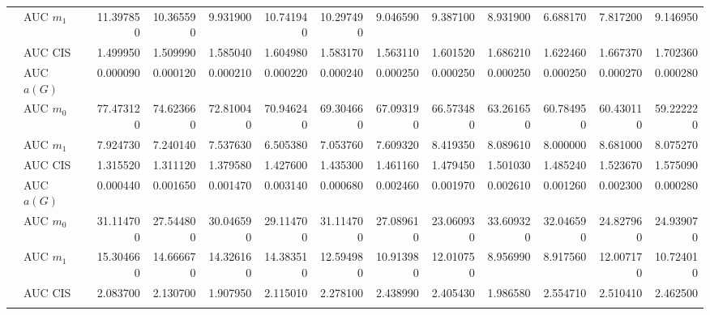 \begin{table}[htbp]
\begin{tabular}{llrrrrrrrrrrr}
    & AUC $m_1$ & 11.397850 & 10.365590 & 9.931900 & 10.741940 & 10.297490 & 9.046590 & 9.387100 & 8.931900 & 6.688170 & 7.817200 & 9.146950 \\
    & AUC CIS & 1.499950 & 1.509990 & 1.585040 & 1.604980 & 1.583170 & 1.563110 & 1.601520 & 1.686210 & 1.622460 & 1.667370 & 1.702360 \\
    \addlinespace
    \multirow{4}{*}{degree} & AUC $a(G)$ & 0.000090 & 0.000120 & 0.000210 & 0.000220 & 0.000240 & 0.000250 & 0.000250 & 0.000250 & 0.000250 & 0.000270 & 0.000280 \\
    & AUC $m_0$ & 77.473120 & 74.623660 & 72.810040 & 70.946240 & 69.304660 & 67.093190 & 66.573480 & 63.261650 & 60.784950 & 60.430110 & 59.222220 \\
    & AUC $m_1$ & 7.924730 & 7.240140 & 7.537630 & 6.505380 & 7.053760 & 7.609320 & 8.419350 & 8.089610 & 8.000000 & 8.681000 & 8.075270 \\
    & AUC CIS & 1.315520 & 1.311120 & 1.379580 & 1.427600 & 1.435300 & 1.461160 & 1.479450 & 1.501030 & 1.485240 & 1.523670 & 1.575090 \\
    \addlinespace
    \multirow{4}{*}{random} & AUC $a(G)$ & 0.000440 & 0.001650 & 0.001470 & 0.003140 & 0.000680 & 0.002460 & 0.001970 & 0.002610 & 0.001260 & 0.002300 & 0.000280 \\
    & AUC $m_0$ & 31.114700 & 27.544800 & 30.046590 & 29.114700 & 31.114700 & 27.089610 & 23.060930 & 33.609320 & 32.046590 & 24.827960 & 24.939070 \\
    & AUC $m_1$ & 15.304660 & 14.666670 & 14.326160 & 14.383510 & 12.594980 & 10.913980 & 12.010750 & 8.956990 & 8.917560 & 12.007170 & 10.724010 \\
    & AUC CIS & 2.083700 & 2.130700 & 1.907950 & 2.115010 & 2.278100 & 2.438990 & 2.405430 & 1.986580 & 2.554710 & 2.510410 & 2.462500 \\
    \addlinespace
    \bottomrule
  \end{tabular}
\end{table}

